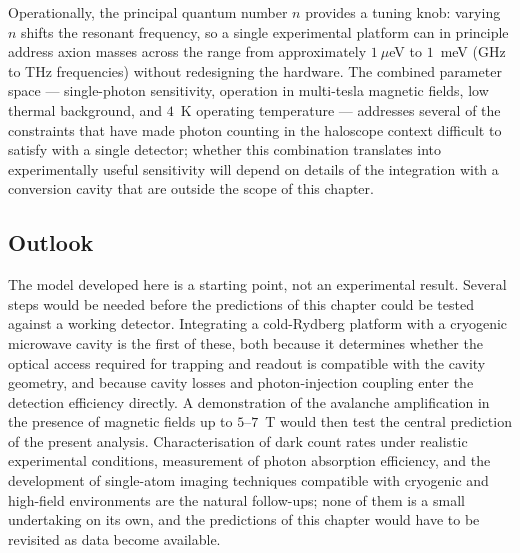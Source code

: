 Operationally, the principal quantum number $n$ provides a tuning knob: varying $n$ shifts the resonant frequency, so a single experimental platform can in principle address axion masses across the range from approximately $1~\mu$eV to $1$~meV (GHz to THz frequencies) without redesigning the hardware. The combined parameter space --- single-photon sensitivity, operation in multi-tesla magnetic fields, low thermal background, and $4$~K operating temperature --- addresses several of the constraints that have made photon counting in the haloscope context difficult to satisfy with a single detector; whether this combination translates into experimentally useful sensitivity will depend on details of the integration with a conversion cavity that are outside the scope of this chapter.

\subsection*{Outlook}

The model developed here is a starting point, not an experimental result. Several steps would be needed before the predictions of this chapter could be tested against a working detector. Integrating a cold-Rydberg platform with a cryogenic microwave cavity is the first of these, both because it determines whether the optical access required for trapping and readout is compatible with the cavity geometry, and because cavity losses and photon-injection coupling enter the detection efficiency directly. A demonstration of the avalanche amplification in the presence of magnetic fields up to $5$--$7$~T would then test the central prediction of the present analysis. Characterisation of dark count rates under realistic experimental conditions, measurement of photon absorption efficiency, and the development of single-atom imaging techniques compatible with cryogenic and high-field environments are the natural follow-ups; none of them is a small undertaking on its own, and the predictions of this chapter would have to be revisited as data become available.

